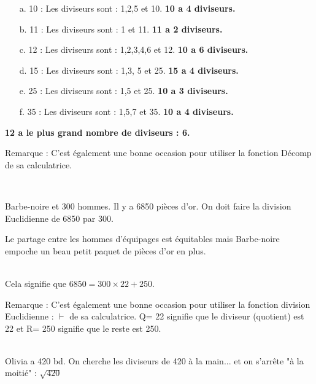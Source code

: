 \documentclass[11pt]{article}
\begin{document}
\begin{enumerate}
    \item[a.] 10 : Les diviseurs sont : 1,2,5 et 10. \textbf{10 a 4 diviseurs.}
    \item[b.] 11 : Les diviseurs sont : 1 et 11. \textbf{11 a 2 diviseurs.}
    \item[c.] 12 : Les diviseurs sont : 1,2,3,4,6 et 12. \textbf{10 a 6 diviseurs.}
    \item[d.] 15 : Les diviseurs sont : 1,3, 5 et 25. \textbf{15 a 4 diviseurs.}
    \item[e.] 25 : Les diviseurs sont : 1,5 et 25. \textbf{10 a 3 diviseurs.}    
    \item[f.] 35 : Les diviseurs sont : 1,5,7 et 35. \textbf{10 a 4 diviseurs.}   
\end{enumerate}
\textbf{12 a le plus grand nombre de diviseurs : 6.}

Remarque : C'est également une bonne occasion pour utiliser la fonction Décomp de sa calculatrice. 

\\

\begin{multicols}{2}
Barbe-noire et 300 hommes. Il y a 6850 pièces d'or.
On doit faire la division Euclidienne de 6850 par 300.

Le partage entre les hommes d'équipages est équitables mais Barbe-noire empoche un beau petit paquet de pièces d'or en plus. \columnbreak

 \\

Cela signifie que $6850 = 300 \times 22 + 250$.

\end{multicols}

Remarque : C'est également une bonne occasion pour utiliser la fonction division Euclidienne : $\vdash$ de sa calculatrice. 
Q= 22 signifie que le diviseur (quotient) est 22 et R= 250 signifie que le reste est 250.

\\

Olivia a 420 bd. On cherche les diviseurs de 420 à la main... et on s'arrête "à la moitié" : $\sqrt{420}$
\end{document}
